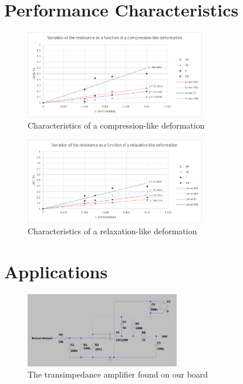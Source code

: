 \documentclass[10pt]{datasheet}
\begin{document}
\newpage

\section{Performance Characteristics}

\begin{figure}[h!]
	\centering
	\includegraphics[width=0.7\textwidth]{Cover/Bench-Compression.png}
    \captionsetup{justification=centering}
	\caption{\small{Characteristics of a compression-like deformation}}
\end{figure}

\begin{figure}[h!]
	\centering
	\includegraphics[width=0.7\textwidth]{Cover/Bench-Relaxation.png}
    \captionsetup{justification=centering}
	\caption{\small{Characteristics of a relaxation-like deformation}}
\end{figure}

\newpage

\section{Applications}

\begin{figure}[h!]
	\centering
	\includegraphics[width=0.6\textwidth]{Cover/TransimpedanceAmp.png}
    \captionsetup{justification=centering}
	\caption{\small{The transimpedance amplifier found on our board}}
\end{figure}
\end{document}
